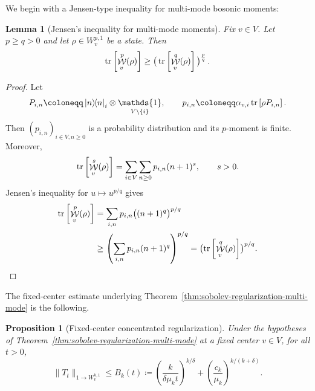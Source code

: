 \documentclass[11pt]{article}
\theoremstyle{myplain}
\newtheorem{lem}[lem]{Lemma}
\newtheorem{prop}[prop]{Proposition}
\theoremstyle{mydefinition}
\theoremstyle{remark}
\DeclareMathOperator{\cW}{\mathcal{W}}
\DeclareMathOperator{\1}{\mathds{1}}
\newcommand{\ketbra}[2]{\left\vert#1\right\rangle\!\! \left\langle#2\right\vert}
\newcommand{\tr}[1][]{\operatorname{tr}%
  \ifx#1\empty \else \left[ #1 \right] \fi}
\begin{document}
        We begin with a Jensen-type inequality for multi-mode bosonic moments:
        \begin{lem}[Jensen’s inequality for multi-mode moments]\label{appx-lem:jensens-inequality-moments-number-operator-multi}
            Fix $v\in V$. Let $p\geq q>0$ and let $\rho\in W_v^{p,1}$ be a state. Then
            \begin{equation}\label{appx-eq:multi-jensen-moment}
                \tr[\cW_v^{p} (\rho)]\geq  \big( \tr[\cW_v^{q} (\rho)] \big)^{\frac{p}{q}}\,.
            \end{equation}
        \end{lem}
        \begin{proof}
            Let
            \begin{equation*}
                P_{i,n}\coloneqq
                \ketbra{n}{n}_i\otimes\1_{V\setminus\{i\}},
                \qquad
                p_{i,n}\coloneqq
                \alpha_{v,i}\tr[\rho P_{i,n}].
            \end{equation*}
            Then $(p_{i,n})_{i\in V,n\geq0}$ is a probability distribution and its $p$-moment is finite. Moreover,
            \begin{equation*}
                \tr[\cW_v^s(\rho)]
                =\sum_{i\in V}\sum_{n\geq0}
                p_{i,n}(n+1)^s,
                \qquad s>0.
            \end{equation*}
            Jensen's inequality for $u\mapsto u^{p/q}$ gives
            \begin{align*}
                \tr[\cW_v^p(\rho)]
                &=\sum_{i,n}p_{i,n}
                \bigl((n+1)^q\bigr)^{p/q}\\
                &\geq
                \left(\sum_{i,n}p_{i,n}(n+1)^q\right)^{p/q}
                =\bigl(\tr[\cW_v^q(\rho)]\bigr)^{p/q}.
            \end{align*}
        \end{proof}
        \noindent The fixed-center estimate underlying Theorem~\ref{thm:sobolev-regularization-multi-mode} is the following.
        \begin{prop}[Fixed-center concentrated regularization]
            \label{appx-thm:sobolev-regularization-multi-mode} Under the hypotheses of Theorem~\ref{thm:sobolev-regularization-multi-mode} at a fixed center $v \in V$, for all $t > 0$,
            \begin{equation}\label{appx-eq:fixed-center-regularization-bound}
                \|T_t\|_{1\to W_v^{k,1}}
                \leq
                B_k(t)\coloneqq
                \left(\frac{k}{\delta\mu_k t}\right)^{k/\delta}
                +\left(\frac{c_k}{\mu_k}\right)^{k/(k+\delta)}.
            \end{equation}
        \end{prop}
\end{document}
